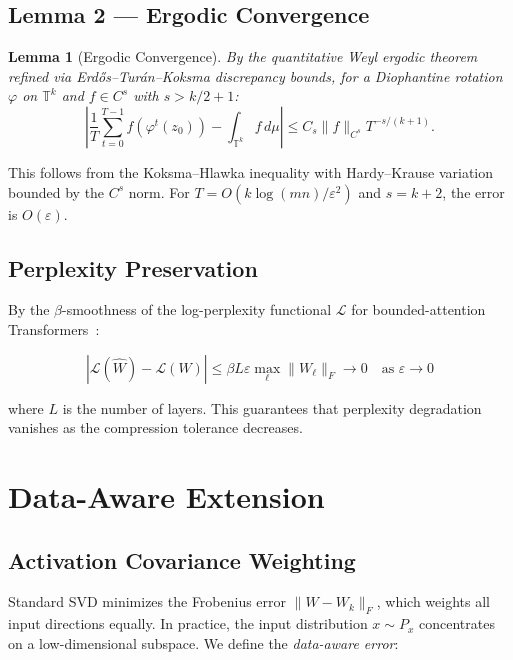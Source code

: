 \documentclass[11pt,a4paper]{article}
\newtheorem{lemma}[theorem]{Lemma}
\begin{document}
\subsection{Lemma 2 --- Ergodic Convergence}

\begin{lemma}[Ergodic Convergence]\label{lem:ergodic}
By the quantitative Weyl ergodic theorem refined via Erd\H{o}s--Tur\'{a}n--Koksma discrepancy bounds, for a Diophantine rotation $\varphi$ on $\mathbb{T}^k$ and $f \in C^s$ with $s > k/2 + 1$:
\begin{equation}
    \left|\frac{1}{T}\sum_{t=0}^{T-1} f(\varphi^t(z_0)) - \int_{\mathbb{T}^k} f\, d\mu\right| \leq C_s \|f\|_{C^s} T^{-s/(k+1)}.
\end{equation}
\end{lemma}

This follows from the Koksma--Hlawka inequality with Hardy--Krause variation bounded by the $C^s$ norm. For $T = O(k \log(mn)/\varepsilon^2)$ and $s = k+2$, the error is $O(\varepsilon)$.

\subsection{Perplexity Preservation}

By the $\beta$-smoothness of the log-perplexity functional $\mathcal{L}$ for bounded-attention Transformers~\cite{hron2022smoothness}:

\begin{equation}
    |\mathcal{L}(\hat{W}) - \mathcal{L}(W)| \leq \beta L \varepsilon \max_\ell \|W_\ell\|_F \to 0 \quad \text{as } \varepsilon \to 0
\end{equation}

where $L$ is the number of layers. This guarantees that perplexity degradation vanishes as the compression tolerance decreases.

\section{Data-Aware Extension}

\subsection{Activation Covariance Weighting}

Standard SVD minimizes the Frobenius error $\|W - W_k\|_F$, which weights all input directions equally. In practice, the input distribution $x \sim P_x$ concentrates on a low-dimensional subspace. We define the \emph{data-aware error}:
\end{document}
